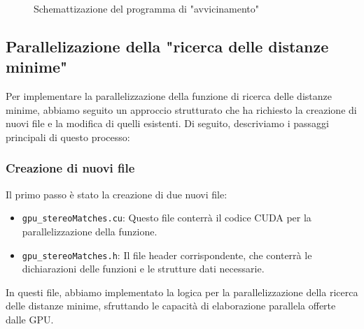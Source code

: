 \documentclass[12pt,a4paper]{report}
\begin{document}
\begin{figure}[h]
    \centering
    \caption{Schemattizazione del programma di "avvicinamento"}
\end{figure}

\vspace{2cm}

\subsection{Parallelizazione della "ricerca delle distanze minime" } \label{distanze-minime-gpu}

Per implementare la parallelizzazione della funzione di ricerca delle distanze minime, abbiamo seguito un approccio strutturato che ha richiesto la creazione di nuovi file e la modifica di quelli esistenti. Di seguito, descriviamo i passaggi principali di questo processo:

\subsubsection{Creazione di nuovi file}
Il primo passo è stato la creazione di due nuovi file:

\begin{itemize}
    \item \texttt{gpu\_stereoMatches.cu}: Questo file conterrà il codice CUDA per la parallelizzazione della funzione.
    \item \texttt{gpu\_stereoMatches.h}: Il file header corrispondente, che conterrà le dichiarazioni delle funzioni e le strutture dati necessarie.
\end{itemize}

In questi file, abbiamo implementato la logica per la parallelizzazione della ricerca delle distanze minime, sfruttando le capacità di elaborazione parallela offerte dalle GPU.
\end{document}
